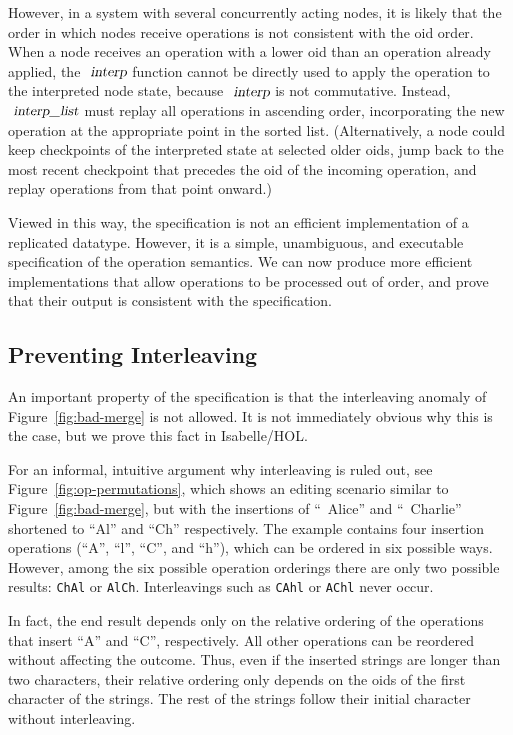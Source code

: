 However, in a system with several concurrently acting nodes, it is likely that the order in which nodes receive operations is not consistent with the oid order.
When a node receives an operation with a lower oid than an operation already applied, the $\isa{interp}$ function cannot be directly used to apply the operation to the interpreted node state, because $\isa{interp}$ is not commutative.
Instead, $\isa{interp{\isacharunderscore}list}$ must replay all operations in ascending order, incorporating the new operation at the appropriate point in the sorted list.
(Alternatively, a node could keep checkpoints of the interpreted state at selected older oids, jump back to the most recent checkpoint that precedes the oid of the incoming operation, and replay operations from that point onward.)

Viewed in this way, the specification is not an efficient implementation of a replicated datatype.
However, it is a simple, unambiguous, and executable specification of the operation semantics.
We can now produce more efficient implementations that allow operations to be processed out of order, and prove that their output is consistent with the specification.

\subsection{Preventing Interleaving}

An important property of the specification is that the interleaving anomaly of Figure~\ref{fig:bad-merge} is not allowed.
It is not immediately obvious why this is the case, but we prove this fact in Isabelle/HOL.

For an informal, intuitive argument why interleaving is ruled out, see Figure~\ref{fig:op-permutations}, which shows an editing scenario similar to Figure~\ref{fig:bad-merge}, but with the insertions of ``~Alice'' and ``~Charlie'' shortened to ``Al'' and ``Ch'' respectively.
The example contains four insertion operations (``A'', ``l'', ``C'', and ``h''), which can be ordered in six possible ways.
However, among the six possible operation orderings there are only two possible results: \texttt{ChAl} or \texttt{AlCh}.
Interleavings such as \texttt{CAhl} or \texttt{AChl} never occur.

In fact, the end result depends only on the relative ordering of the operations that insert ``A'' and ``C'', respectively.
All other operations can be reordered without affecting the outcome.
Thus, even if the inserted strings are longer than two characters, their relative ordering only depends on the oids of the first character of the strings.
The rest of the strings follow their initial character without interleaving.

